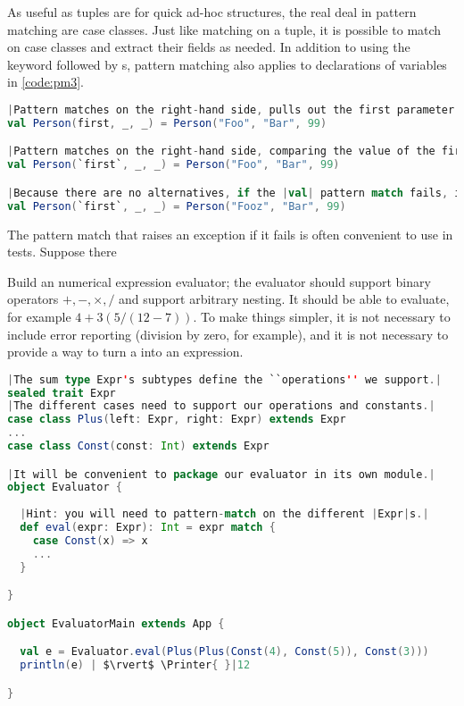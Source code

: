 \documentclass[10 pt]{article}
\begin{document}
As useful as tuples are for quick ad-hoc structures, the real deal in pattern matching are case classes. Just like matching on a tuple, it is possible to match on case classes and extract their fields as needed. In addition to using the  keyword followed by s, pattern matching also applies to declarations of variables in \autoref{code:pm3}.

\begin{lstlisting}[caption={Pattern matching III}, label={code:pm3}, language=Scala, escapechar=|]
|Pattern matches on the right-hand side, pulls out the first parameter as |val first: String|.|
val Person(first, _, _) = Person("Foo", "Bar", 99)

|Pattern matches on the right-hand side, comparing the value of the first parameter to be equal to in-scope variable |first|. (Notice the backticks.)|
val Person(`first`, _, _) = Person("Foo", "Bar", 99)

|Because there are no alternatives, if the |val| pattern match fails, it raises an exception.|
val Person(`first`, _, _) = Person("Fooz", "Bar", 99)
\end{lstlisting}

The pattern match that raises an exception if it fails is often convenient to use in tests. Suppose there 

\begin{example}
Build an numerical expression evaluator; the evaluator should support binary operators $+, -, \times, /$ and support arbitrary nesting. It should be able to evaluate, for example $4+3(5/(12-7))$. To make things simpler, it is not necessary to include error reporting (division by zero, for example), and it is not necessary to provide a way to turn a  into an expression.

\begin{lstlisting}[caption={Expression evaluator}, label={code:ee}, language=Scala, escapechar=|]
|The sum type Expr's subtypes define the ``operations'' we support.|
sealed trait Expr
|The different cases need to support our operations and constants.|
case class Plus(left: Expr, right: Expr) extends Expr
...
case class Const(const: Int) extends Expr

|It will be convenient to package our evaluator in its own module.|
object Evaluator {
  
  |Hint: you will need to pattern-match on the different |Expr|s.|
  def eval(expr: Expr): Int = expr match {
    case Const(x) => x
    ...
  }

}

object EvaluatorMain extends App {

  val e = Evaluator.eval(Plus(Plus(Const(4), Const(5)), Const(3)))
  println(e) | $\rvert$ \Printer{ }|12

}
\end{lstlisting}
\end{example}
\end{document}
